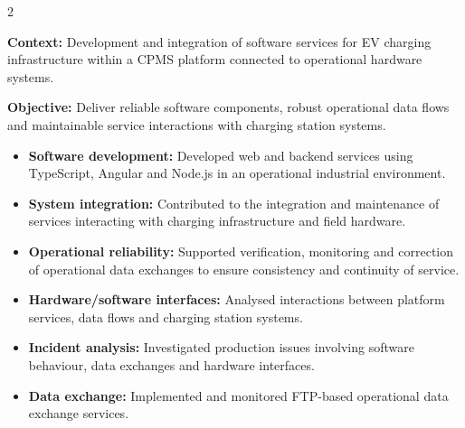 \documentclass[8pt,a4paper,ragged2e,withhyper]{altacv}
\begin{document}



\makecvheader
\vspace{-0.3cm}


\begin{paracol}{2}



\textbf{Context:} Development and integration of software services for EV charging infrastructure within a CPMS platform connected to operational hardware systems.

\textbf{Objective:} Deliver reliable software components, robust operational data flows and maintainable service interactions with charging station systems.

\begin{itemize}
  \item \textbf{Software development:} Developed web and backend services using TypeScript, Angular and Node.js in an operational industrial environment.
  \item \textbf{System integration:} Contributed to the integration and maintenance of services interacting with charging infrastructure and field hardware.
  \item \textbf{Operational reliability:} Supported verification, monitoring and correction of operational data exchanges to ensure consistency and continuity of service.
  \item \textbf{Hardware/software interfaces:} Analysed interactions between platform services, data flows and charging station systems.
  \item \textbf{Incident analysis:} Investigated production issues involving software behaviour, data exchanges and hardware interfaces.
  \item \textbf{Data exchange:} Implemented and monitored FTP-based operational data exchange services.
\end{itemize}


\end{paracol}
\end{document}
